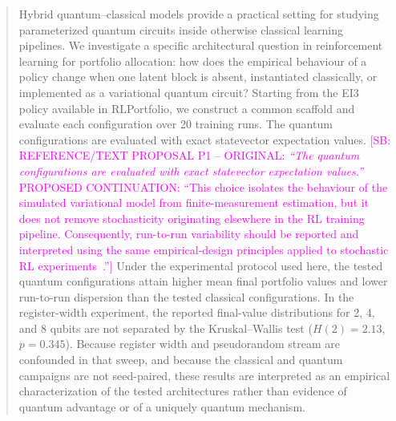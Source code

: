 \documentclass[aps,floatfix,superscriptaddress,twocolumn,tightenlines,amsmath,amssymb,nofootinbib,10pt,longbibliography,prl]{revtex4-2}
\newcommand{\sam}[1]{\textcolor{magenta}{[SB: {#1}]}}
\begin{document}
\begin{abstract}
Hybrid quantum--classical models provide a practical setting for studying parameterized quantum circuits inside otherwise classical learning pipelines. We investigate a specific architectural question in reinforcement learning for portfolio allocation: how does the empirical behaviour of a policy change when one latent block is absent, instantiated classically, or implemented as a variational quantum circuit? Starting from the EI3 policy available in RLPortfolio, we construct a common scaffold and evaluate each configuration over 20 training runs. The quantum configurations are evaluated with exact statevector expectation values.
\sam{REFERENCE/TEXT PROPOSAL P1 -- ORIGINAL: \textit{``The quantum configurations are evaluated with exact statevector expectation values.''} PROPOSED CONTINUATION: ``This choice isolates the behaviour of the simulated variational model from finite-measurement estimation, but it does not remove stochasticity originating elsewhere in the RL training pipeline. Consequently, run-to-run variability should be reported and interpreted using the same empirical-design principles applied to stochastic RL experiments~\cite{Henderson2018DRLMatters,Agarwal2021StatisticalPrecipice,Patterson2024EmpiricalDesign}.''} Under the experimental protocol used here, the tested quantum configurations attain higher mean final portfolio values and lower run-to-run dispersion than the tested classical configurations. In the register-width experiment, the reported final-value distributions for 2, 4, and 8 qubits are not separated by the Kruskal--Wallis test ($H(2)=2.13$, $p=0.345$). Because register width and pseudorandom stream are confounded in that sweep, and because the classical and quantum campaigns are not seed-paired, these results are interpreted as an empirical characterization of the tested architectures rather than evidence of quantum advantage or of a uniquely quantum mechanism.
\end{abstract}
\maketitle
\onecolumngrid
\end{document}
